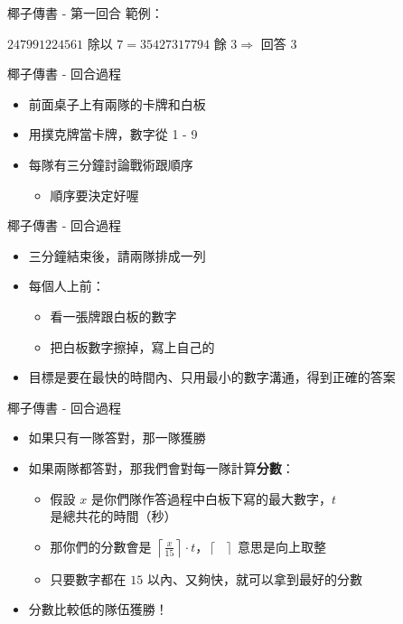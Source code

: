 \begin{frame}{椰子傳書 - 第一回合}
 範例：
  \begin{center}
     \newline
    $247991224561$ 除以 $7 = 35427317794$ 餘 $3 \Rightarrow$ 回答 $3$
  \end{center}
\end{frame}

\begin{frame}{椰子傳書 - 回合過程}
  \begin{itemize}
    \item 前面桌子上有兩隊的卡牌和白板
    \item 用撲克牌當卡牌，數字從 1 - 9
    \item 每隊有三分鐘討論戰術跟順序
    \begin{itemize}
      \item 順序要決定好喔
    \end{itemize}
  \end{itemize}
\end{frame}

\begin{frame}{椰子傳書 - 回合過程}
  \begin{itemize}
    \item 三分鐘結束後，請兩隊排成一列
    \item 每個人上前：
    \begin{itemize}
      \item 看一張牌跟白板的數字
      \item 把白板數字擦掉，寫上自己的
    \end{itemize}
    \item 目標是要在最快的時間內、只用最小的數字溝通，得到正確的答案
  \end{itemize}
\end{frame}

\begin{frame}{椰子傳書 - 回合過程}
  \begin{itemize}
    \item 如果只有一隊答對，那一隊獲勝
    \item 如果兩隊都答對，那我們會對每一隊計算\textbf{分數}：
    \begin{itemize}
      \item 假設 $x$ 是你們隊作答過程中白板下寫的最大數字，$t$ 是總共花的時間（秒）
      \item 那你們的分數會是 $\left\lceil \frac{x}{15} \right\rceil \cdot t$，$\left\lceil \text{ } \right\rceil$ 意思是向上取整
      \item 只要數字都在 $15$ 以內、又夠快，就可以拿到最好的分數
    \end{itemize}
    \item 分數比較低的隊伍獲勝！
  \end{itemize}
\end{frame}

